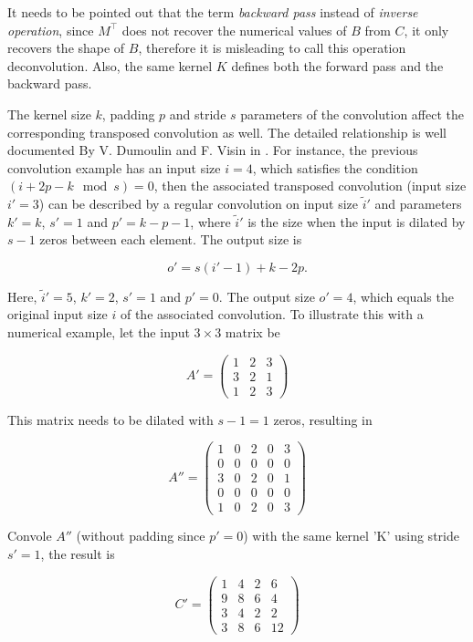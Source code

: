 It needs to be pointed out that the term \textit{backward pass} instead of \textit{inverse operation},
since $M^\intercal$ does not recover the numerical values of $B$ from $C$, it only recovers the shape of $B$,
therefore it is misleading to call this operation deconvolution. Also, the same kernel $K$ defines both
the forward pass and the backward pass.

The kernel size $k$, padding $p$ and stride $s$ parameters of the convolution affect the corresponding
transposed convolution as well. The detailed relationship is well documented By V. Dumoulin and F. Visin in
\cite{dumoulin:conv_arithmetic}. For instance, the previous convolution example has an input size $i = 4$,
which satisfies the condition $(i + 2p - k \mod s) = 0$, then the associated transposed convolution
(input size $i' = 3$) can be described by a regular convolution on input size $\tilde{i}'$ and parameters
$k' = k$, $s' = 1$ and $p' = k - p - 1$,
where $\tilde{i}'$ is the size when the input is dilated by $s - 1$ zeros between each element. The output
size is

\begin{equation}
  o' = s(i' - 1) + k - 2p.
\end{equation}

Here, $\tilde{i}' = 5$, $k' = 2$, $s' = 1$ and $p' = 0$. The output size $o' = 4$, which equals the
original input size $i$ of the associated convolution. To illustrate this with a numerical example, let
the input $3 \times 3$ matrix be

$$
A' =
  \begin{pmatrix}
    1 & 2 & 3 \\
    3 & 2 & 1 \\
    1 & 2 & 3
  \end{pmatrix}
$$

This matrix needs to be dilated with $s - 1 = 1$ zeros, resulting in

$$
A'' =
  \begin{pmatrix}
    1 & 0 & 2 & 0 & 3 \\
    0 & 0 & 0 & 0 & 0 \\
    3 & 0 & 2 & 0 & 1 \\
    0 & 0 & 0 & 0 & 0 \\
    1 & 0 & 2 & 0 & 3
  \end{pmatrix}
$$

Convole $A''$ (without padding since $p' = 0$) with the same kernel 'K' using stride $s' = 1$, the result
is

$$
C' =
  \begin{pmatrix}
    1 & 4 & 2 & 6 \\
    9 & 8 & 6 & 4 \\
    3 & 4 & 2 & 2 \\
    3 & 8 & 6 & 12
  \end{pmatrix}
$$

